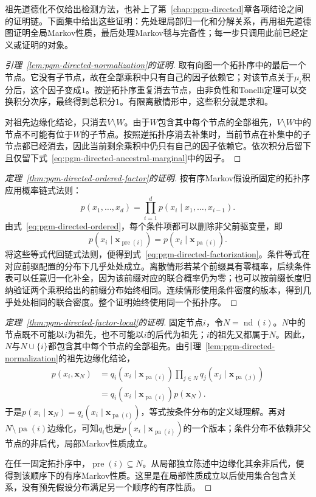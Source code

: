 祖先道德化不仅给出检测方法，也补上了第~\ref{chap:pgm-directed}章各项结论之间的证明链。下面集中给出这些证明：先处理局部归一化和分解关系，再用祖先道德图证明全局Markov性质，最后处理Markov毯与完备性；每一步只调用此前已经定义或证明的对象。

\begin{proof}[引理~\ref{lem:pgm-directed-normalization}的证明]
取有向图一个拓扑序中的最后一个节点。它没有子节点，故在全部乘积中只有自己的因子依赖它；对该节点关于$\mu_i$积分后，这个因子变成$1$。按逆拓扑序重复消去节点，由非负性和Tonelli定理可以交换积分次序，最终得到总积分$1$。有限离散情形中，这些积分就是求和。

对祖先边缘化结论，只消去$V\setminus W$。由于$W$包含其中每个节点的全部祖先，$V\setminus W$中的节点不可能有位于$W$的子节点。按照逆拓扑序消去补集时，当前节点在补集中的子节点都已经消去，因此当前剩余乘积中仍只有自己的因子依赖它。依次积分后留下且仅留下式~\eqref{eq:pgm-directed-ancestral-marginal}中的因子。
\end{proof}

\begin{proof}[定理~\ref{thm:pgm-directed-ordered-factor}的证明]
按有序Markov假设所固定的拓扑序应用概率链式法则：
\[
  p(x_1,\ldots,x_d)=
  \prod_{i=1}^{d}p(x_i\mid x_1,\ldots,x_{i-1}).
\]
由式~\eqref{eq:pgm-directed-ordered}，每个条件项都可以删除非父前驱变量，即
\[
  p(x_i\mid\bm{x}_{\operatorname{pre}(i)})
    =p(x_i\mid\bm{x}_{\operatorname{pa}(i)}).
\]
将这些等式代回链式法则，便得到式~\eqref{eq:pgm-directed-factorization}。条件等式在对应前驱配置的分布下几乎处处成立。离散情形若某个前缀具有零概率，后续条件表可以任意归一化补全，因为该前缀对应的联合概率仍为零；也可以按前缀长度归纳验证两个乘积给出的前缀分布始终相同。连续情形使用条件密度的版本，得到几乎处处相同的联合密度。整个证明始终使用同一个拓扑序。
\end{proof}

\begin{proof}[定理~\ref{thm:pgm-directed-factor-local}的证明]
固定节点$i$，令$N=\operatorname{nd}(i)$。$N$中的节点既不可能以$i$为祖先，也不可能以$i$的后代为祖先；$i$的祖先又都属于$N$。因此，$N$与$N\cup\{i\}$都包含其中每个节点的全部祖先。由引理~\ref{lem:pgm-directed-normalization}的祖先边缘化结论，
\[
  \begin{aligned}
    p(x_i,\bm{x}_N)
      &=q_i(x_i\mid\bm{x}_{\operatorname{pa}(i)})
        \prod_{j\in N}q_j(x_j\mid\bm{x}_{\operatorname{pa}(j)})\\
      &=q_i(x_i\mid\bm{x}_{\operatorname{pa}(i)})p(\bm{x}_N).
  \end{aligned}
\]
于是$p(x_i\mid\bm{x}_N)=q_i(x_i\mid\bm{x}_{\operatorname{pa}(i)})$，等式按条件分布的定义域理解。再对$N\setminus\operatorname{pa}(i)$边缘化，可知$q_i$也是$p(x_i\mid\bm{x}_{\operatorname{pa}(i)})$的一个版本；条件分布不依赖非父节点的非后代，局部Markov性质成立。

在任一固定拓扑序中，$\operatorname{pre}(i)\subseteq N$。从局部独立陈述中边缘化其余非后代，便得到该顺序下的有序Markov性质。这里是在局部性质成立以后使用集合包含关系，没有预先假设分布满足另一个顺序的有序性质。
\end{proof}

